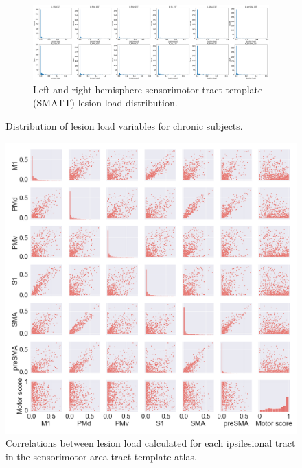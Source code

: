 \documentclass[10pt]{article}
\begin{document}
\begin{figure}
\begin{subfigure}{1\textwidth}
  \centering
  \includegraphics[width=1\linewidth]{figures/all2h_lesionload.png}
  \caption{Left and right hemisphere sensorimotor tract template (SMATT) lesion load distribution.}
  \label{fig:sfig2}
\end{subfigure}
\caption{Distribution of lesion load variables for chronic subjects.}
\label{lesion_load_dist}
\end{figure}


\begin{figure}[ht]
\centering
\includegraphics[width=1\linewidth]{figures/SMATT_scatterplts.png}
\caption{Correlations between lesion load calculated for each ipsilesional tract in the sensorimotor area tract template atlas.}
\label{smatt_pairwise_correlations}
\end{figure}
\end{document}
